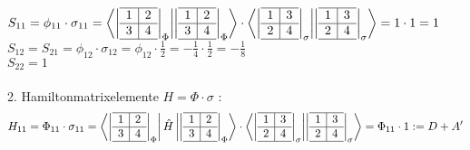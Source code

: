 \documentclass[12pt,a4paper]{article}
\begin{document}
$S_{11} = \phi_{11} \cdot \sigma_{11} = \bra{
\left|
  \begin{array}{c|c}
  \hline 
    1 & 2 \\ \hline 
    3 & 4 \\
    \hline 
  \end{array}
\right| _{\Phi}
} \ket{
\left|
  \begin{array}{c|c}
  \hline 
    1 & 2 \\ \hline 
    3 & 4 \\
    \hline 
  \end{array}
\right| _{\Phi}
} \cdot \bra{\left|
  \begin{array}{c|c}
  \hline 
    1 & 3 \\ \hline 
    2 & 4 \\
    \hline 
  \end{array}
\right|_\sigma} \ket{\left|
  \begin{array}{c|c}
  \hline 
    1 & 3 \\ \hline 
    2 & 4 \\
    \hline 
  \end{array}
\right|_\sigma}
= 1 \cdot 1 = 1$ \\ 

$S_{12} = S_{21} = \phi_{12} \cdot \sigma_{12} = \phi_{12} \cdot \frac{1}{2} = - \frac{1}{4} \cdot \frac{1}{2} = - \frac{1}{8} $ \\ 

$S_{22} = 1$  \\ \\


2. Hamiltonmatrixelemente $H = \Phi \cdot \sigma$ :\\

$$H_{11} = \Phi_{11} \cdot \sigma_{11}= \bra{
\left|
  \begin{array}{c|c}
  \hline 
    1 & 2 \\ \hline 
    3 & 4 \\
    \hline 
  \end{array}
\right| _{\Phi}
} \hat{H} \ket{
\left|
  \begin{array}{c|c}
  \hline 
    1 & 2 \\ \hline 
    3 & 4 \\
    \hline 
  \end{array}
\right| _{\Phi}
} \cdot \bra{\left|
  \begin{array}{c|c}
  \hline 
    1 & 3 \\ \hline 
    2 & 4 \\
    \hline 
  \end{array}
\right|_\sigma} \ket{\left|
  \begin{array}{c|c}
  \hline 
    1 & 3 \\ \hline 
    2 & 4 \\
    \hline 
  \end{array}
\right|_\sigma} = \Phi_{11}\cdot 1 := D + A'
$$ \\
\end{document}
